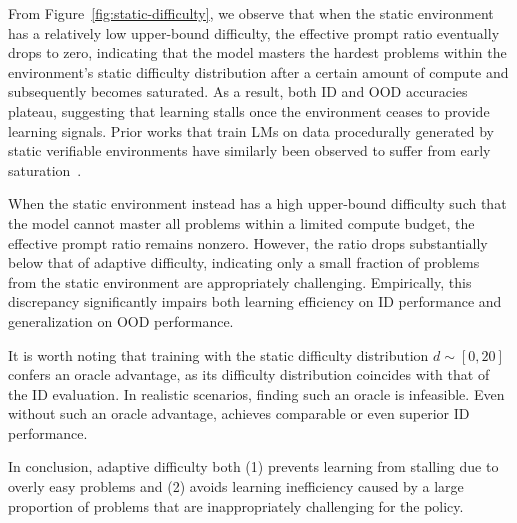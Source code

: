 \documentclass{article}
\theoremstyle{plain}
\theoremstyle{definition}
\theoremstyle{remark}
\begin{document}
From Figure~\ref{fig:static-difficulty}, we observe that when the static environment has a relatively low upper-bound difficulty, the effective prompt ratio 
eventually drops to zero, indicating that the model masters the hardest problems within the environment's static difficulty distribution after a certain amount of compute and subsequently becomes saturated.
As a result, both ID and OOD accuracies plateau, suggesting that learning stalls once the environment ceases to provide learning signals.
Prior works that train LMs on data procedurally generated by static verifiable environments have similarly been observed to suffer from early saturation~\citep{li2025internbootcamp}.

When the static environment instead has a high upper-bound difficulty such that the model cannot master all problems within a limited compute budget, the effective prompt ratio remains nonzero.
However, the ratio drops substantially below that of adaptive difficulty, indicating only a small fraction of problems from the static environment are appropriately challenging.
Empirically, this discrepancy significantly impairs both learning efficiency on ID performance and generalization on OOD performance.

It is worth noting that training with the static difficulty distribution $d \sim [0, 20]$ confers an oracle advantage, as its difficulty distribution coincides with that of the ID evaluation.
In realistic scenarios, finding such an oracle is infeasible.
Even without such an oracle advantage, \ours{} achieves comparable or even superior ID performance.


In conclusion, adaptive difficulty both (1) prevents learning from stalling due to overly easy problems and (2) avoids learning inefficiency caused by a large proportion of problems that are inappropriately challenging for the policy.
\end{document}
